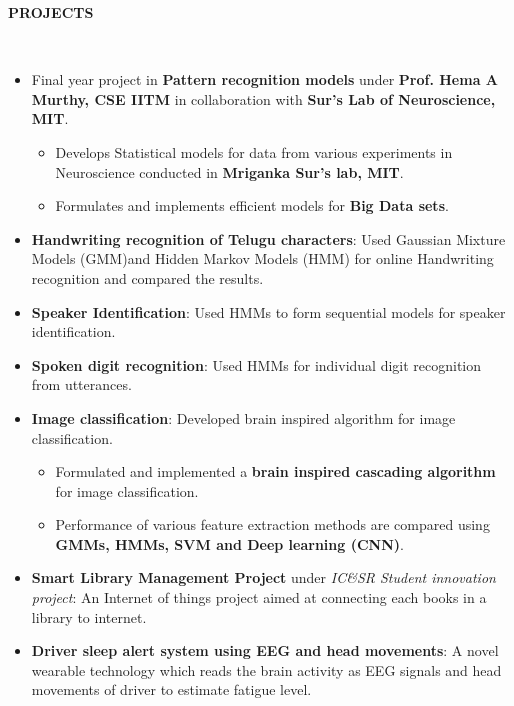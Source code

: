 \documentclass[a4paper,10pt]{article}
\newcommand{\lsep}{-0.5cm}
\newcommand{\resheading}[1]{{\small \colorbox{mygrey}{\begin{minipage}{0.975\textwidth}{\textbf{#1 \vphantom{p\^{E}}}}\end{minipage}}}}
\begin{document}
\resheading{\textbf{PROJECTS} }\\[\lsep]
    \begin{itemize}
        \item Final year project in \textbf{Pattern recognition models} under \textbf{Prof. Hema A Murthy, CSE IITM} in collaboration with \textbf{Sur's Lab of Neuroscience, MIT}.
        \begin{itemize}
            \vspace{-5pt}
            \item Develops Statistical models for data from various experiments in Neuroscience conducted in \textbf{Mriganka Sur's lab, MIT}.
            \item Formulates and implements efficient models for \textbf{Big Data sets}.
            \vspace{-5pt}
        \end{itemize}        
        \item \textbf{Handwriting recognition of Telugu characters}: Used Gaussian Mixture Models (GMM)and Hidden Markov Models (HMM) for online Handwriting recognition and compared the results.
        \vspace{-5pt}
        \item \textbf{Speaker Identification}: Used HMMs to form sequential models for speaker identification.
        \vspace{-5pt}
        \item \textbf{Spoken digit recognition}: Used HMMs for individual digit recognition from utterances. 
        \vspace{-5pt}
        \item \textbf{Image classification}: Developed brain inspired algorithm for image classification.
        \begin{itemize}
        \vspace{-5pt}
            \item Formulated and implemented a \textbf{brain inspired cascading algorithm} for image classification.
            \item Performance of various feature extraction methods are compared using \textbf{GMMs, HMMs, SVM and Deep learning (CNN)}.
            \vspace{-5pt}           
        \end{itemize}        
        \item \textbf{Smart Library Management Project} under \textit{IC\&SR Student innovation project}: An Internet of things project aimed at connecting each books in a library to internet.
        \vspace{-5pt}
        \item \textbf{Driver sleep alert system using EEG and head movements}: A novel wearable technology which reads the brain activity as EEG signals and head movements of driver to estimate fatigue level.
    \end{itemize}
\end{document}
